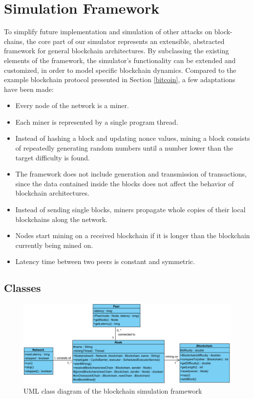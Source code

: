 \documentclass[a4paper,12pt,twoside]{report}
\begin{document}
\section{Simulation Framework}
To simplify future implementation and simulation of other attacks on block-chains, the core part of our simulator represents an extensible, abstracted framework for general blockchain architectures. By subclassing the existing elements of the framework, the simulator's functionality can be extended and customized, in order to model specific blockchain dynamics. Compared to the example blockchain protocol presented in Section \ref{bitcoin}, a few adaptations have been made:
\begin{itemize}
\item Every node of the network is a miner.
\item Each miner is represented by a single program thread.
\item Instead of hashing a block and updating nonce values, mining a block consists of repeatedly generating random numbers until a number lower than the target difficulty is found.
\item The framework does not include generation and transmission of transactions, since the data contained inside the blocks does not affect the behavior of blockchain architectures.
\item Instead of sending single blocks, miners propagate whole copies of their local blockchains along the network.
\item Nodes start mining on a received blockchain if it is longer than the blockchain currently being mined on.
\item Latency time between two peers is constant and symmetric.
\end{itemize}
\subsection{Classes}
\begin{figure}[ht]
	\centering
  \includegraphics[width=\textwidth]{Framework.png}
	\caption{UML class diagram of the blockchain simulation framework}
	\label{framework}
\end{figure}
\end{document}
